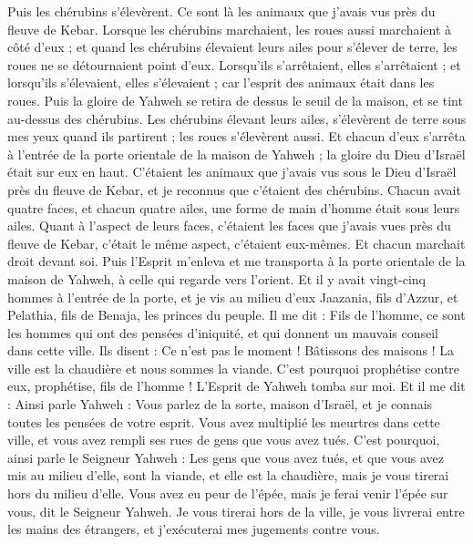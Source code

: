 \begin{multicols}{2}
Puis les chérubins s'élevèrent. Ce sont là les animaux que j'avais vus près du fleuve de Kebar.
Lorsque les chérubins marchaient, les roues aussi marchaient à côté d'eux ; et quand les chérubins élevaient leurs ailes pour s'élever de terre, les roues ne se détournaient point d'eux.
Lorsqu'ils s'arrêtaient, elles s'arrêtaient ; et lorsqu'ils s'élevaient, elles s'élevaient ; car l'esprit des animaux était dans les roues.
Puis la gloire de Yahweh se retira de dessus le seuil de la maison, et se tint au-dessus des chérubins.
Les chérubins élevant leurs ailes, s'élevèrent de terre sous mes yeux quand ils partirent ; les roues s'élevèrent aussi. Et chacun d'eux s'arrêta à l'entrée de la porte orientale de la maison de Yahweh ; la gloire du Dieu d'Israël était sur eux en haut.
C'étaient les animaux que j'avais vus sous le Dieu d'Israël près du fleuve de Kebar, et je reconnus que c'étaient des chérubins.
Chacun avait quatre faces, et chacun quatre ailes, une forme de main d'homme était sous leurs ailes.
Quant à l'aspect de leurs faces, c'étaient les faces que j'avais vues près du fleuve de Kebar, c'était le même aspect, c'étaient eux-mêmes. Et chacun marchait droit devant soi.
\VerseOne{}Puis l'Esprit m'enleva et me transporta à la porte orientale de la maison de Yahweh, à celle qui regarde vers l'orient. Et il y avait vingt-cinq hommes à l'entrée de la porte, et je vis au milieu d'eux Jaazania, fils d'Azzur, et Pelathia, fils de Benaja, les princes du peuple.
Il me dit : Fils de l'homme, ce sont les hommes qui ont des pensées d'iniquité, et qui donnent un mauvais conseil dans cette ville.
Ils disent : Ce n'est pas le moment ! Bâtissons des maisons ! La ville est la chaudière et nous sommes la viande.
C'est pourquoi prophétise contre eux, prophétise, fils de l'homme !
L'Esprit de Yahweh tomba sur moi. Et il me dit : Ainsi parle Yahweh : Vous parlez de la sorte, maison d'Israël, et je connais toutes les pensées de votre esprit.
Vous avez multiplié les meurtres dans cette ville, et vous avez rempli ses rues de gens que vous avez tués.
C'est pourquoi, ainsi parle le Seigneur Yahweh : Les gens que vous avez tués, et que vous avez mis au milieu d'elle, sont la viande, et elle est la chaudière, mais je vous tirerai hors du milieu d'elle.
Vous avez eu peur de l'épée, mais je ferai venir l'épée sur vous, dit le Seigneur Yahweh.
Je vous tirerai hors de la ville, je vous livrerai entre les mains des étrangers, et j'exécuterai mes jugements contre vous.

\end{multicols}
